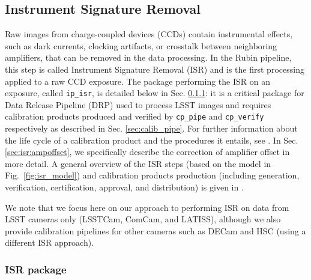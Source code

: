 \subsection{Instrument Signature Removal}
\label{sec:isr}

Raw images from charge-coupled devices (CCDs) contain instrumental effects, such as dark currents, clocking artifacts, or crosstalk between neighboring amplifiers, that can be removed in the data processing.
In the Rubin pipeline, this step is called Instrument Signature Removal (ISR) and is the first processing applied to a raw CCD exposure.
The package performing the ISR on an exposure, called \texttt{ip\_isr}, is detailed below in Sec. \ref{sec:ip_isr}: it is a critical package for Data Release Pipeline (DRP) used to process LSST images and requires calibration products produced and verified by \texttt{cp\_pipe} and \texttt{cp\_verify} respectively as described in Sec. \ref{sec:calib_pipe}. For further information about the life cycle of a calibration product and the procedures it entails, see \citet{DMTN-222}. In Sec. \ref{sec:isr:ampoffset}, we specifically describe the correction of amplifier offset in more detail.
A general overview of the ISR steps (based on the model in Fig.~\ref{fig:isr_model}) and calibration products production (including generation, verification, certification, approval, and distribution) is given in \citet{2024arXiv240414516P}.

We note that we focus here on our approach to performing ISR on data from LSST cameras only (LSSTCam, ComCam, and LATISS), although we also provide calibration pipelines for other cameras such as DECam and HSC (using a different ISR approach).

\subsubsection{ISR package}
\label{sec:ip_isr}

